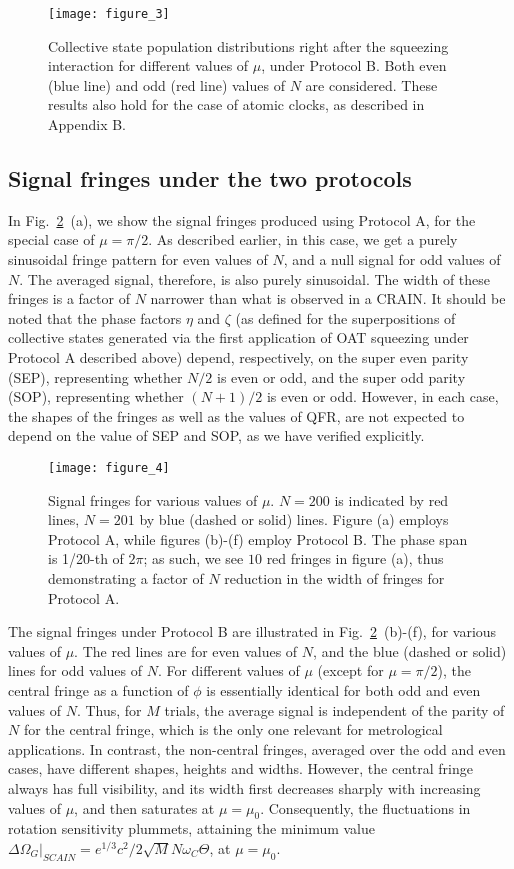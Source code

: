 \documentclass[aps,pra,letterpaper,superscriptaddress,showpacs,amsmath,floats,twocolumn]{revtex4-1}
\begin{document}
\begin{figure}[h]
\texttt{[image: figure\_3]}
\caption{Collective state population distributions right after the squeezing interaction for different values of $\mu$, under Protocol B. Both even (blue line) and odd (red line) values of $N$ are considered. These results also hold for the case of atomic clocks, as described in Appendix B.}
\label{fig:3}
\end{figure}
%

\subsection{Signal fringes under the two protocols}
In Fig.~\ref{fig:4}~(a), we show the signal fringes produced using Protocol A, for the special case of $\mu=\pi/2$. As described earlier, in this case, we get a purely sinusoidal fringe pattern for even values of $N$, and a null signal for odd values of $N$. The averaged signal, therefore, is also purely sinusoidal. The width of these fringes is a factor of $N$ narrower than what is observed in a CRAIN. It should be noted that the phase factors $\eta$ and $\zeta$ (as defined for the superpositions of collective states generated via the first application of OAT squeezing under Protocol A described above) depend, respectively, on the super even parity (SEP), representing whether $N/2$ is even or odd, and the super odd parity (SOP), representing whether $(N+1)/2$ is even or odd. However, in each case, the shapes of the fringes as well as the values of QFR, are not expected to depend on the value of SEP and SOP, as we have verified explicitly.

\begin{figure}[h]
\texttt{[image: figure\_4]}
\caption{Signal fringes for various values of $\mu$. $N = 200$ is indicated by red lines, $N = 201$ by blue (dashed or solid) lines. Figure (a) employs Protocol A, while figures (b)-(f) employ Protocol B. The phase span is 1/20-th of $2\pi$; as such, we see $10$ red fringes in figure (a), thus demonstrating a factor of $N$ reduction in the width of fringes for Protocol A.}
\label{fig:4}
\end{figure}
%

The signal fringes under Protocol B are illustrated in Fig.~\ref{fig:4}~(b)-(f), for various values of $\mu$. The red lines are for even values of $N$, and the blue (dashed or solid) lines for odd values of $N$. For different values of $\mu$ (except for $\mu=\pi/2$), the central fringe as a function of $\phi$ is essentially identical for both odd and even values of $N$. Thus, for $M$ trials, the average signal is independent of the parity of $N$ for the central fringe, which is the only one relevant for metrological applications. In contrast, the non-central fringes, averaged over the odd and even cases, have different shapes, heights and widths. However, the central fringe always has full visibility, and its width first decreases sharply with increasing values of $\mu$, and then saturates at $\mu=\mu_0$. Consequently, the fluctuations in rotation sensitivity plummets, attaining the minimum value $\Delta \Omega_G|_{SCAIN} = e^{1/3}c^2/2\sqrt{M}N\omega_C\Theta$, at $\mu=\mu_0$.
\end{document}
